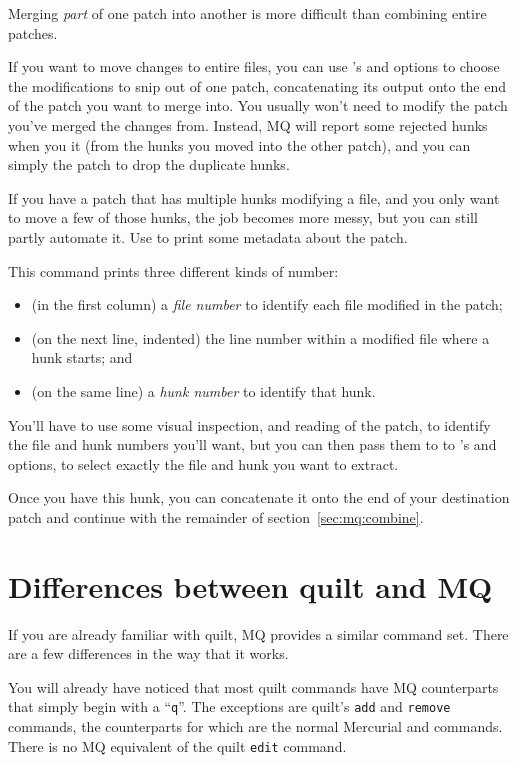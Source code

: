 Merging \emph{part} of one patch into another is more difficult than
combining entire patches.

If you want to move changes to entire files, you can use
's  and
 options to choose the modifications to snip
out of one patch, concatenating its output onto the end of the patch
you want to merge into.  You usually won't need to modify the patch
you've merged the changes from.  Instead, MQ will report some rejected
hunks when you  it (from the hunks you moved into the
other patch), and you can simply  the patch to drop
the duplicate hunks.

If you have a patch that has multiple hunks modifying a file, and you
only want to move a few of those hunks, the job becomes more messy,
but you can still partly automate it.  Use  to
print some metadata about the patch.

This command prints three different kinds of number:
\begin{itemize}
\item (in the first column) a \emph{file number} to identify each file
  modified in the patch;
\item (on the next line, indented) the line number within a modified
  file where a hunk starts; and
\item (on the same line) a \emph{hunk number} to identify that hunk.
\end{itemize}

You'll have to use some visual inspection, and reading of the patch,
to identify the file and hunk numbers you'll want, but you can then
pass them to to 's 
and  options, to select exactly the file
and hunk you want to extract.

Once you have this hunk, you can concatenate it onto the end of your
destination patch and continue with the remainder of
section~\ref{sec:mq:combine}.

\section{Differences between quilt and MQ}

If you are already familiar with quilt, MQ provides a similar command
set.  There are a few differences in the way that it works.

You will already have noticed that most quilt commands have MQ
counterparts that simply begin with a ``\texttt{q}''.  The exceptions
are quilt's \texttt{add} and \texttt{remove} commands, the
counterparts for which are the normal Mercurial  and
 commands.  There is no MQ equivalent of the quilt
\texttt{edit} command.

